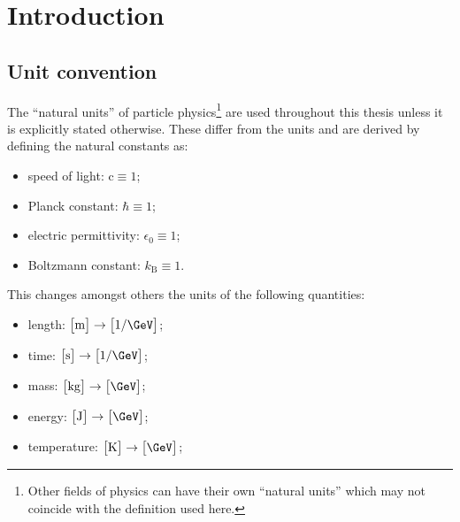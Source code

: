 \chapter*{Introduction}

\section*{Unit convention}

The ``natural units'' of particle physics\footnote{Other fields of physics can have their own ``natural units'' which may not coincide with the definition used here.} are used throughout this thesis unless it is explicitly stated otherwise. These differ from the  units and are derived by defining the natural constants as:

\begin{itemize}
\item speed of light: $\mathrm{c}\equiv 1$;
\item Planck constant: $\hbar\equiv 1$;
\item electric permittivity: $\epsilon_{0}\equiv 1$;
\item Boltzmann constant: $k_\mathrm{B}\equiv 1$.
\end{itemize}

This changes amongst others the units of the following quantities:

\begin{itemize}
\item length: $\big[\mathrm{m}\big]\rightarrow \big[1/\GeV\big]$;
\item time: $\big[\mathrm{s}\big]\rightarrow \big[1/\GeV\big]$;
\item mass: $\big[\mathrm{kg}\big]\rightarrow \big[\GeV\big]$;
\item energy: $\big[\mathrm{J}\big]\rightarrow \big[\GeV\big]$;
\item temperature: $\big[\mathrm{K}\big]\rightarrow \big[\GeV\big]$;
\end{itemize}



